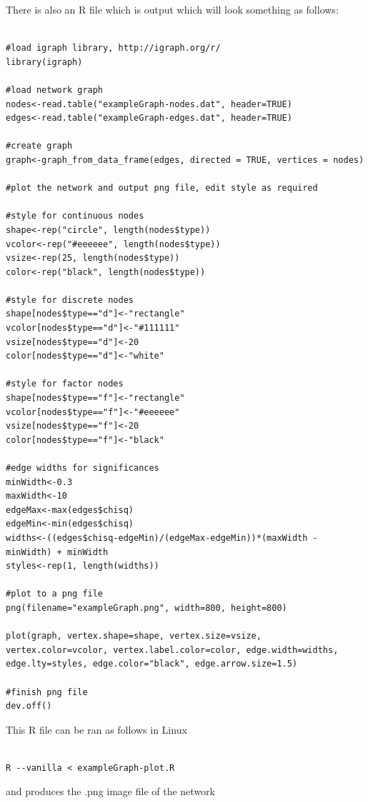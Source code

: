 \documentclass[a4paper,12pt]{article}
\begin{document}
There is also an R file which is output which will look something as follows: 
\vspace{0.35cm} \begin{lstlisting}

#load igraph library, http://igraph.org/r/
library(igraph)

#load network graph
nodes<-read.table("exampleGraph-nodes.dat", header=TRUE)
edges<-read.table("exampleGraph-edges.dat", header=TRUE)

#create graph
graph<-graph_from_data_frame(edges, directed = TRUE, vertices = nodes)

#plot the network and output png file, edit style as required

#style for continuous nodes
shape<-rep("circle", length(nodes$type))
vcolor<-rep("#eeeeee", length(nodes$type))
vsize<-rep(25, length(nodes$type))
color<-rep("black", length(nodes$type))

#style for discrete nodes
shape[nodes$type=="d"]<-"rectangle"
vcolor[nodes$type=="d"]<-"#111111"
vsize[nodes$type=="d"]<-20
color[nodes$type=="d"]<-"white"

#style for factor nodes
shape[nodes$type=="f"]<-"rectangle"
vcolor[nodes$type=="f"]<-"#eeeeee"
vsize[nodes$type=="f"]<-20
color[nodes$type=="f"]<-"black"

#edge widths for significances
minWidth<-0.3
maxWidth<-10
edgeMax<-max(edges$chisq)
edgeMin<-min(edges$chisq)
widths<-((edges$chisq-edgeMin)/(edgeMax-edgeMin))*(maxWidth - minWidth) + minWidth
styles<-rep(1, length(widths))

#plot to a png file
png(filename="exampleGraph.png", width=800, height=800)

plot(graph, vertex.shape=shape, vertex.size=vsize, vertex.color=vcolor, vertex.label.color=color, edge.width=widths, edge.lty=styles, edge.color="black", edge.arrow.size=1.5)

#finish png file
dev.off()

\end{lstlisting} \vspace{0.35cm}
This R file can be ran as follows in Linux 
\vspace{0.35cm} \begin{lstlisting}

R --vanilla < exampleGraph-plot.R

\end{lstlisting} \vspace{0.35cm}
and produces the .png image file of the network 
\end{document}
